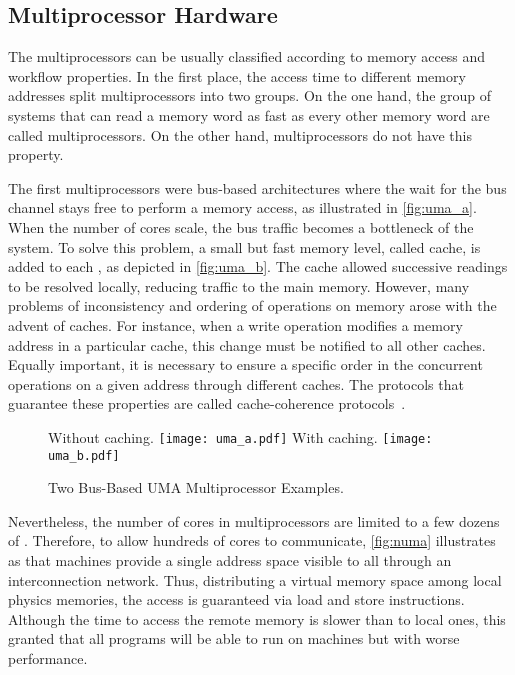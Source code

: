 		\subsection{Multiprocessor Hardware}
		\label{sec.multiprocessor-hw}

			The multiprocessors can be usually classified according
			to memory access
			and workflow properties.
			In the first place, the access time to different memory addresses
			split multiprocessors into two groups.
			On the one hand, the group of systems that can read a memory word
			as fast as every other memory word are called \uma multiprocessors.
			On the other hand, \numa multiprocessors do not have this property.

			The first \uma multiprocessors were bus-based architectures where
			the \cpu wait for the bus channel stays free to perform a memory
			access, as illustrated in \autoref{fig:uma_a}.
			When the number of cores scale, the bus traffic becomes a
			bottleneck of the system.
			To solve this problem, a small but fast memory level, called cache,
			is added to each \cpu, as depicted in \autoref{fig:uma_b}.
			The cache allowed successive readings to be resolved locally,
			reducing traffic to the main memory.
			However, many problems of inconsistency and ordering of operations
			on memory arose with the advent of caches.
			For instance, when a write operation modifies a memory address in
			a particular cache, this change must be notified to all other caches.
			Equally important, it is necessary to ensure a specific order in
			the concurrent operations on a given address through different caches.
			The protocols that guarantee these properties are called cache-coherence
			protocols~\cite{tanenbaum:4ed}.

			\begin{figure}[!tb]
				\centering%
				\caption{Two Bus-Based UMA Multiprocessor Examples.}%
				\label{fig:uma}%

					{Without caching.}%
					{\texttt{[image: uma\_a.pdf]}}%
				\hspace{1.5cm}%
					{With caching.}%
					{\texttt{[image: uma\_b.pdf]}}%

			\end{figure}

			Nevertheless, the number of cores in \uma multiprocessors are limited
			to a few dozens of \cpus.
			Therefore, to allow hundreds of cores to communicate, \autoref{fig:numa} illustrates
			as that \numa machines provide a single address space visible to all \cpus
			through an interconnection network.
			Thus, distributing a virtual memory space among local physics memories,
			the access is guaranteed via load and store instructions.
			Although the time to access the remote memory is slower than to local ones,
			this granted that all \uma programs will be able to run on \numa machines
			but with worse performance.

